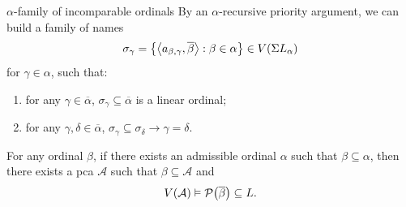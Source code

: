 \documentclass{beamer}
\newcommand\tuple[1]{\left\langle #1 \right\rangle}
\begin{document}
\begin{frame}{$\alpha$-family of incomparable ordinals}
  By an $\alpha$-recursive priority argument, we can build a family of names
  \[\sigma_\gamma = \left\{\tuple{a_{\beta, \gamma}, \overline{\beta}} : \beta \in \alpha\right\} \in V\mleft(\Sigma L_\alpha\mright)\]
  for $\gamma \in \alpha$, such that:
  \begin{lemma}
    \begin{enumerate}
      \item for any $\gamma \in \overline{\alpha}$, $\sigma_\gamma \subseteq \overline{\alpha}$ is a linear ordinal;
      \item for any $\gamma, \delta \in \overline{\alpha}$, $\sigma_\gamma \subseteq \sigma_\delta \rightarrow \gamma = \delta$.
    \end{enumerate}
  \end{lemma}

  \begin{corollary}
    For any ordinal $\beta$, if there exists an admissible ordinal $\alpha$ such that $\beta \subseteq \alpha$, then there exists a pca $\mathcal{A}$ such that $\beta \subseteq \mathcal{A}$ and
    \[V\mleft(\mathcal{A}\mright) \vDash \mathcal{P}\mleft(\overline{\beta}\mright) \subseteq L.\]
  \end{corollary}
\end{frame}
\end{document}
